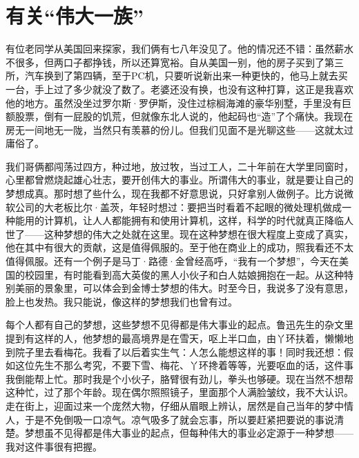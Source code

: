\chapter{有关“伟大一族”}

有位老同学从美国回来探家，我们俩有七八年没见了。他的情况还不错：虽然薪水不很多，但两口子都挣钱，所以还算宽裕。自从美国一别，他的房子买到了第三所，汽车换到了第四辆，至于PC机，只要听说新出来一种更快的，他马上就去买一台，手上过了多少就没了数了。老婆还没有换，也没有这种打算，这正是我喜欢他的地方。虽然没坐过罗尔斯·罗伊斯，没住过棕榈海滩的豪华别墅，手里没有巨额股票，倒有一屁股的饥荒，但就像东北人说的，他起码也“造”了个痛快。我现在房无一间地无一陇，当然只有羡慕的份儿。但我们见面不是光聊这些——这就太过庸俗了。 

我们哥俩都闯荡过四方，种过地，放过牧，当过工人，二十年前在大学里同窗时，心里都曾燃烧起雄心壮志，要开创伟大的事业。所谓伟大的事业，就是要让自己的梦想成真。那时想了些什么，现在我都不好意思说，只好拿别人做例子。比方说微软公司的大老板比尔·盖茨，年轻时想过：要把当时看着不起眼的微处理机做成一种能用的计算机，让人人都能拥有和使用计算机，这样，科学的时代就真正降临人世了——这种梦想的伟大之处就在这里。现在这种梦想在很大程度上变成了真实，他在其中有很大的贡献，这是值得佩服的。至于他在商业上的成功，照我看还不太值得佩服。还有一个例子是马丁·路德·金曾经高呼，“我有一个梦想”，今天在美国的校园里，有时能看到高大英俊的黑人小伙子和白人姑娘拥抱在一起。从这种特别美丽的景象里，可以体会到金博士梦想的伟大。时至今日，我说多了没有意思，脸上也发热。我只能说，像这样的梦想我们也曾有过。 

每个人都有自己的梦想，这些梦想不见得都是伟大事业的起点。鲁迅先生的杂文里提到有这样的人，他梦想的最高境界是在雪天，呕上半口血，由丫环扶着，懒懒地到院子里去看梅花。我看了以后着实生气：人怎么能想这样的事！同时我还想：假如这位先生不那么考究，不要下雪、梅花、丫环搀着等等，光要呕血的话，这件事我倒能帮上忙。那时我是个小伙子，胳臂很有劲儿，拳头也够硬。现在当然不想帮这种忙，过了那个年龄。现在偶尔照照镜子，里面那个人满脸皱纹，我不大认识。走在街上，迎面过来一个庞然大物，仔细从眉眼上辨认，居然是自己当年的梦中情人，于是不免倒吸一口凉气。凉气吸多了就会忘事，所以要赶紧把要说的事说清楚。梦想虽不见得都是伟大事业的起点，但每种伟大的事业必定源于一种梦想——我对这件事很有把握。 

